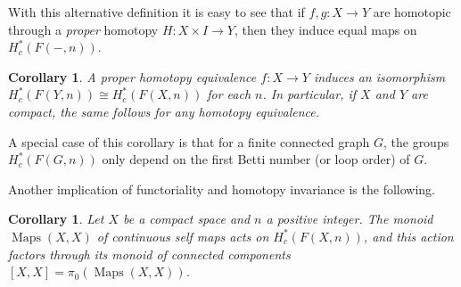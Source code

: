 \documentclass[12pt]{article}
\newcommand{\EndSpace}[1]{\operatorname{Maps}({#1},{#1})}
\theoremstyle{plain}
\newtheorem{prop}[thm]{Proposition}
\newtheorem{cor}[thm]{Corollary}
\theoremstyle{definition}
\theoremstyle{remark}
\begin{document}
With this alternative definition it is easy to see that if $f,g:X\to Y$ are homotopic through a \emph{proper} homotopy $H:X\times I \to Y$, then they induce equal maps on $H^*_c(F(-,n))$.


    
    

\begin{cor}\label{cor:proper-homotopy-invariance}
    A proper homotopy equivalence $f\colon X\to Y$ induces an isomorphism $H_c^*(F(Y, n)) \cong H_c^*(F(X, n))$ for each $n$. In particular, if $X$ and $Y$ are compact, the same follows for any homotopy equivalence.
\end{cor}

A special case of this corollary is that for a finite connected graph $G$, the groups $H_c^*(F(G, n))$ only depend on the first Betti number (or loop order) of $G$.

Another implication of functoriality and homotopy invariance is the following.
{\begin{cor}\label{action-monoid-self-maps}
    Let $X$ be a compact space and $n$ a positive integer. The monoid $\EndSpace{X}$ of continuous self maps acts on $H_c^{\ast}(F(X, n))$, and this action factors through its monoid of connected components $[X,X] = \pi_0(\EndSpace{X})$.
\end{cor}}
\end{document}
